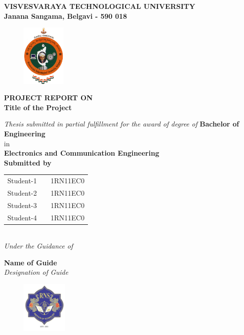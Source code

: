 
\begin{titlingpage}
\thispagestyle{empty}\centering

\setlength{\toptafiddle}{1in}
\setlength{\bottafiddle}{1in}
\vspace*{-1.25in}
\enlargethispage{\toptafiddle}
\large 
\textbf{VISVESVARAYA TECHNOLOGICAL UNIVERSITY\\
	Janana Sangama, Belgavi - 590 018}\\
\vspace{0.2cm}
\begin{figure}[h]
\centering
\includegraphics[height=3cm]{images/vtu.png}
\end{figure}
{\textbf{PROJECT REPORT ON}}\\

\Huge{\textbf{\color{red}Title of the Project}}
\vspace{0.5cm}

\large \textit{Thesis submitted in partial fulfillment for the award of degree of }{\textbf{Bachelor of Engineering}}\\
in \\\textbf{Electronics and Communication Engineering}
\vspace{0.5cm}\\
{\textbf{Submitted by}}


\begin{tabular}{ccc}

Student-1 & \hspace{5cm}  &1RN11EC0\\
Student-2 &   &1RN11EC0\\
Student-3 &   &1RN11EC0\\
Student-4 &   &1RN11EC0\\

\end{tabular}
\vspace{0.5cm}\\
\textit{Under the Guidance of}


\Large{\textbf{Name of Guide}}\\
\textit{Designation of Guide}\\

\begin{figure}[h]
	\centering
	\includegraphics[height=2.5cm]{images/rns1.jpg}
\end{figure}


\end{titlingpage}
